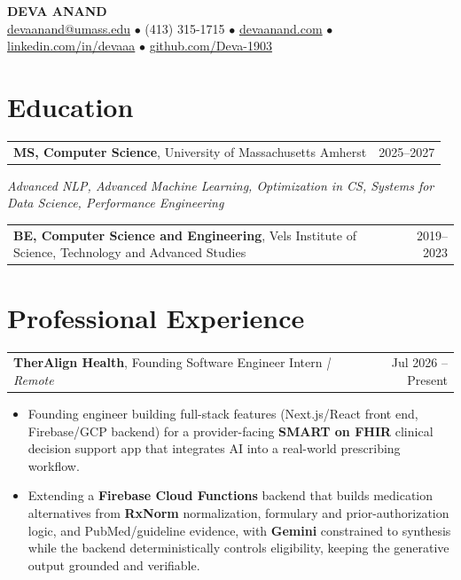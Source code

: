 \documentclass[letterpaper,11pt]{article}
\makeatletter
\newcommand{\eduItem}[3]{%
  \begin{tabular*}{\textwidth}{@{}l@{\extracolsep{\fill}}r@{}}
    \textbf{#1}, #2 & #3 \\
  \end{tabular*}\par
}
\newcommand{\expItem}[4]{%
  \vspace{2pt}
  \begin{tabular*}{\textwidth}{@{}l@{\extracolsep{\fill}}r@{}}
    \textbf{#1}, #2 \textit{| #3} & #4 \\
  \end{tabular*}\par\vspace{-3pt}
}
\makeatother
\begin{document}
\begin{center}
    {\fontsize{18}{20}\selectfont\bfseries DEVA ANAND}\\ \vspace{3pt}
    {\small
    \href{mailto:devaanand@umass.edu}{devaanand@umass.edu}
    \enspace$\bullet$\enspace
    (413) 315-1715
    \enspace$\bullet$\enspace
    \href{https://devaanand.com}{devaanand.com}
    \enspace$\bullet$\enspace
    \href{https://linkedin.com/in/devaaa/}{linkedin.com/in/devaaa}
    \enspace$\bullet$\enspace
    \href{https://github.com/Deva-1903}{github.com/Deva-1903}}
\end{center}
\vspace{-8pt}

\section{Education}
\eduItem{MS, Computer Science}{University of Massachusetts Amherst}{2025--2027}
{\small\textit{Advanced NLP, Advanced Machine Learning, Optimization in CS, Systems for Data Science, Performance Engineering}}\par
\vspace{3pt}
\eduItem{BE, Computer Science and Engineering}{Vels Institute of Science, Technology and Advanced Studies}{2019--2023}

\section{Professional Experience}

\expItem{TherAlign Health}{Founding Software Engineer Intern}{Remote}{Jul 2026 -- Present}
\begin{itemize}
  \item Founding engineer building full-stack features (Next.js/React front end, Firebase/GCP backend) for a provider-facing \textbf{SMART on FHIR} clinical decision support app that integrates AI into a real-world prescribing workflow.
  \item Extending a \textbf{Firebase Cloud Functions} backend that builds medication alternatives from \textbf{RxNorm} normalization, formulary and prior-authorization logic, and PubMed/guideline evidence, with \textbf{Gemini} constrained to synthesis while the backend deterministically controls eligibility, keeping the generative output grounded and verifiable.
\end{itemize}
\end{document}

